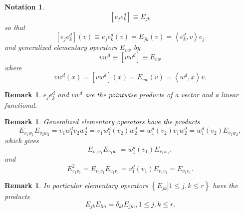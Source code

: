\documentclass[aps,preprint]{revtex4}%
\newtheorem{notation}[theorem]{Notation}
\newtheorem{remark}[theorem]{Remark}
\begin{document}
\begin{notation}%
\begin{equation}
\left[  e_{j}e_{k}^{d}\right]  \equiv E_{jk}%
\end{equation}
so that
\begin{equation}
\left[  e_{j}e_{k}^{d}\right]  \left(  v\right)  \equiv e_{j}e_{k}^{d}\left(
v\right)  =E_{jk}\left(  v\right)  =\left\langle e_{k}^{d},v\right\rangle
e_{j}%
\end{equation}
and generalized elementary operators $E_{vw}$ by
\begin{equation}
vw^{d}\equiv\left[  vw^{d}\right]  \equiv E_{vw}%
\end{equation}
where
\begin{equation}
vw^{d}\left(  x\right)  =\left[  vw^{d}\right]  \left(  x\right)
=E_{vw}\left(  v\right)  =\left\langle w^{d},x\right\rangle v.
\end{equation}

\end{notation}

\begin{remark}
$e_{j}e_{k}^{d}$ and $vw^{d}$ are the pointwise products of a vector and a
linear functional.
\end{remark}

\begin{remark}
Generalized elementary operators have the products
\begin{equation}
E_{v_{1}w_{1}}E_{v_{2}w_{2}}=v_{1}w_{1}^{d}v_{2}w_{2}^{d}=v_{1}w_{1}%
^{d}\left(  v_{2}\right)  w_{2}^{d}=w_{1}^{d}\left(  v_{2}\right)  v_{1}%
w_{2}^{d}=w_{1}^{d}\left(  v_{2}\right)  E_{v_{1}w_{2}},
\end{equation}
which gives
\begin{equation}
E_{v_{1}w_{1}}E_{v_{1}w_{1}}=w_{1}^{d}\left(  v_{1}\right)  E_{v_{1}w_{1}},
\end{equation}
and
\begin{equation}
E_{v_{1}v_{1}}^{2}=E_{v_{1}v_{1}}E_{v_{1}v_{1}}=v_{1}^{d}\left(  v_{1}\right)
E_{v_{1}v_{1}}=E_{v_{1}v_{1}}.
\end{equation}

\end{remark}

\begin{remark}
In particular elementary operators $\left\{  \left.  E_{jk}\right\vert 1\leq
j,k\leq r\right\}  $ have the products
\begin{equation}
E_{jk}E_{lm}=\delta_{kl}E_{jm},1\leq j,k\leq r.
\end{equation}

\end{remark}
\end{document}
